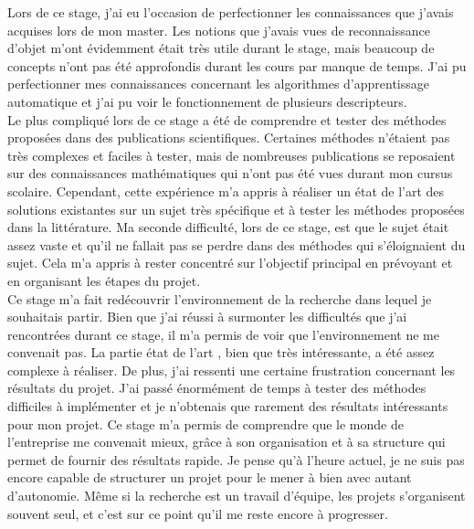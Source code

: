 Lors de ce stage, j'ai eu l'occasion de perfectionner les connaissances que j'avais acquises lors de mon master.
Les notions que j'avais vues de reconnaissance d'objet m'ont évidemment était très utile durant le stage, mais 
beaucoup de concepts n'ont pas été approfondis durant les cours par manque de temps. J'ai pu perfectionner mes 
connaissances concernant les algorithmes d'apprentissage automatique et j'ai pu voir le fonctionnement de plusieurs
descripteurs.\\ 

Le plus compliqué lors de ce stage a été de comprendre et tester des méthodes proposées dans des publications scientifiques.
Certaines méthodes n'étaient pas très complexes et faciles à tester, mais de nombreuses publications se reposaient sur des connaissances
mathématiques qui n'ont pas été vues durant mon cursus scolaire. Cependant, cette expérience m'a appris à réaliser un état de l'art des 
solutions existantes sur un sujet très spécifique et à tester les méthodes proposées dans la littérature. Ma seconde difficulté,
lors de ce stage, est que le sujet était assez vaste et qu'il ne fallait pas se perdre dans des méthodes qui s'éloignaient du sujet.
Cela m'a appris à rester concentré sur l'objectif principal en prévoyant et en organisant les étapes du projet.\\ 

Ce stage m'a fait redécouvrir l'environnement de la recherche dans lequel je souhaitais partir. Bien que j'ai réussi à surmonter
les difficultés que j'ai rencontrées durant ce stage, il m'a permis de voir que l'environnement ne me convenait pas. La partie 
\og état de l'art \fg, bien que très intéressante, a été assez complexe à réaliser. De plus, j'ai ressenti une certaine frustration
concernant les résultats du projet. J'ai passé énormément de temps à tester des méthodes difficiles à implémenter et je n'obtenais
que rarement des résultats intéressants pour mon projet. Ce stage m'a permis de comprendre que le monde de l'entreprise me
convenait mieux, grâce à son organisation et à sa structure qui permet de fournir des résultats 
rapide. Je pense qu'à l'heure actuel, je ne suis pas encore capable de structurer un projet pour
le mener à bien avec autant d'autonomie. Même si la recherche est un travail d'équipe, les projets 
s'organisent souvent seul, et c'est sur ce point qu'il me reste encore à progresser.
